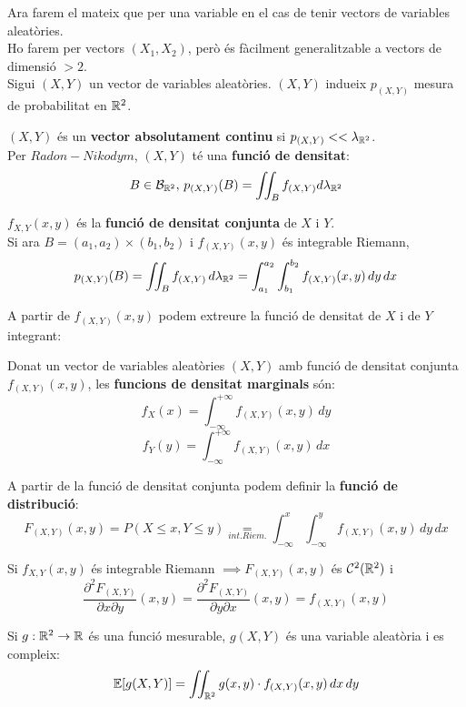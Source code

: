 Ara farem el mateix que per una variable en el cas de tenir vectors de variables aleatòries.\\
Ho farem per vectors $(X_{1},X_{2})$, però és fàcilment generalitzable a vectors de dimensió $> 2$. \\
Sigui $(X,Y)$ un vector de variables aleatòries. $(X,Y)$ indueix $p_{(X,Y)}$ mesura de probabilitat en $\mathbb{R}^{2}$.

\begin{defi}
  $(X,Y)$ és un \textbf{vector absolutament continu} si $p_{(X,Y)}<<\lambda_{\mathbb{R}^{2}}$. \\
  Per $Radon-Nikodym$, $(X,Y)$ té una \textbf{funció de densitat}:
  \[
    B\in\mathcal{B}_{\mathbb{R}^{2}}, \, p_{(X,Y)}(B)=\iint_{B}f_{(X,Y)}d\lambda_{\mathbb{R}^{2}}
  \]
\end{defi}

\begin{defi}
  $f_{X,Y}(x,y)$ és la \textbf{funció de densitat conjunta} de $X$ i $Y$.\\
  Si ara $B=(a_{1},a_{2})\times(b_{1},b_{2})$ i $f_{(X,Y)}(x,y)$ és integrable Riemann, 
  \[
    p_{(X,Y)}(B)=\iint_{B}f_{(X,Y)}\,d\lambda_{\mathbb{R}^{2}}=\int_{a_{1}}^{a_{2}}\int_{b_{1}}^{b_{2}}f_{(X,Y)}(x,y)\,dy\,dx
  \]
\end{defi}

A partir de $f_{(X,Y)}(x,y)$ podem extreure la funció de densitat de $X$ i de $Y$ integrant:

\begin{defi}
  Donat un vector de variables aleatòries $(X,Y)$ amb funció de densitat conjunta $f_{(X,Y)}(x,y)$, 
  les \textbf{funcions de densitat marginals} són:
  \[
    f_{X}(x) = \int_{-\infty}^{+\infty}f_{(X,Y)}(x,y) \, dy
  \]
  \[
    f_{Y}(y) = \int_{-\infty}^{+\infty}f_{(X,Y)}(x,y) \, dx
  \]
\end{defi}

A partir de la funció de densitat conjunta podem definir la \textbf{funció de distribució}: 
\[
  F_{(X,Y)}(x,y) = P(X \leq x, Y \leq y) \underset{int. Riem.}{=} \int_{-\infty}^{x}\int_{-\infty}^{y} f_{(X,Y)}(x,y) \, dy \, dx
\]

\begin{obs}
  Si $f_{X,Y}(x,y)$ és integrable Riemann $\implies F_{(X,Y)}(x,y)$ és $\mathcal{C}^{2}(\mathbb{R}^{2})$ i
  \[
    \frac{\partial^{2}F_{(X,Y)}}{\partial x \partial y}(x,y) = \frac{\partial^{2}F_{(X,Y)}}{\partial 
    y \partial x}(x,y) = f_{(X,Y)}(x,y)
  \]
\end{obs}

\begin{obs}
  Si $g:\mathbb{R}^{2} \to \mathbb{R}$ és una funció mesurable, $g(X,Y)$ és una variable aleatòria i es compleix:
  \[
    \mathbb{E}[g(X,Y)] = \iint_{\mathbb{R}^{2}} g(x,y)\cdot f_{(X,Y)}(x,y) \, dx \, dy
  \]
\end{obs}


